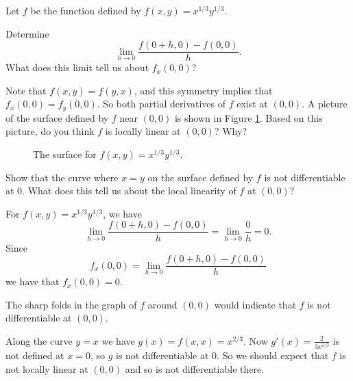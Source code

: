 \begin{activity} \label{A:10.4.2} Let $f$ be the function defined by $f(x,y) = x^{1/3}y^{1/3}$.
    \ba
    \item Determine
    \[\lim_{h \to 0} \frac{f(0+h,0)-f(0,0)}{h}.\]
    What does this limit tell us about $f_x(0,0)$?



    \item Note that $f(x,y)=f(y,x)$, and this symmetry implies that $f_x(0,0) = f_y(0,0)$. So both partial derivatives of $f$ exist at $(0,0)$. A picture of the surface defined by $f$ near $(0,0)$ is shown in Figure \ref{F:10.4.Not_diff}. Based on this picture, do you think $f$ is locally linear at $(0,0)$? Why?
\begin{figure}[h]
\begin{center}
\end{center}
\caption{The surface for $f(x,y) = x^{1/3}y^{1/3}$.}
\label{F:10.4.Not_diff}
\end{figure}



    \item Show that the curve where $x=y$ on the surface defined by $f$ is not differentiable at 0. What does this tell us about the local linearity of $f$ at $(0,0)$?



    \ea

\end{activity}
\begin{smallhint}

\end{smallhint}
\begin{bighint}

\end{bighint}
\begin{activitySolution}
\ba
\item For $f(x,y) = x^{1/3}y^{1/3}$, we have 
\[\lim_{h \to 0} \frac{f(0+h,0)-f(0,0)}{h} = \lim_{h \to 0} \frac{0}{h} = 0.\]
Since 
\[f_x(0,0) = \lim_{h \to 0} \frac{f(0+h,0)-f(0,0)}{h}\]
we have that $f_x(0,0) = 0$. 

\item The sharp folds in the graph of $f$ around $(0,0)$ would indicate that $f$ is not differentiable at $(0,0)$.  

\item Along the curve $y=x$ we have $g(x) = f(x,x) = x^{2/3}$. Now $g'(x) = \frac{2}{3x^{1/3}}$ is not defined at $x=0$, so $g$ is not differentiable at $0$. So we should expect that $f$ is not locally linear at $(0,0)$ and so is not differentiable there. 

\ea
\end{activitySolution}
\aftera
